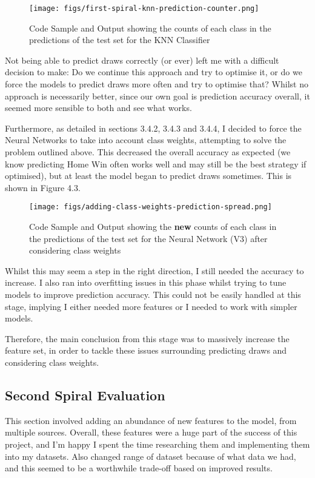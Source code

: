 \documentclass[12pt,a4paper,twoside,openright]{report}
\begin{document}
\begin{figure}[h]
  \centering
  \texttt{[image: figs/first-spiral-knn-prediction-counter.png]}
  \caption{Code Sample and Output showing the counts of each class in the predictions of the test set for the KNN Classifier}
  \label{fig:spiral1-knn-counter}
\end{figure}

Not being able to predict draws correctly (or ever) left me with a difficult decision to make: Do we continue this approach and try to optimise it, or do we force the models to predict draws more often and try to optimise that? Whilst no approach is necessarily better, since our own goal is prediction accuracy overall, it seemed more sensible to both and see what works. 

Furthermore, as detailed in sections 3.4.2, 3.4.3 and 3.4.4, I decided to force the Neural Networks to take into account class weights, attempting to solve the problem outlined above. This decreased the overall accuracy as expected (we know predicting Home Win often works well and may still be the best strategy if optimised), but at least the model began to predict draws sometimes. This is shown in Figure 4.3.

\begin{figure}[h]
  \centering
  \texttt{[image: figs/adding-class-weights-prediction-spread.png]}
  \caption{Code Sample and Output showing the \textbf{new} counts of each class in the predictions of the test set for the Neural Network (V3) after considering class weights}
  \label{fig:adding-class-weights}
\end{figure}

Whilst this may seem a step in the right direction, I still needed the accuracy to increase. I also ran into overfitting issues in this phase whilst trying to tune models to improve prediction accuracy. This could not be easily handled at this stage, implying I either needed more features or I needed to work with simpler models.

Therefore, the main conclusion from this stage was to massively increase the feature set, in order to tackle these issues surrounding predicting draws and considering class weights.

\subsection{Second Spiral Evaluation}

This section involved adding an abundance of new features to the model, from multiple sources. Overall, these features were a huge part of the success of this project, and I'm happy I spent the time researching them and implementing them into my datasets. Also changed range of dataset because of what data we had, and this seemed to be a worthwhile trade-off based on improved results.
\end{document}
